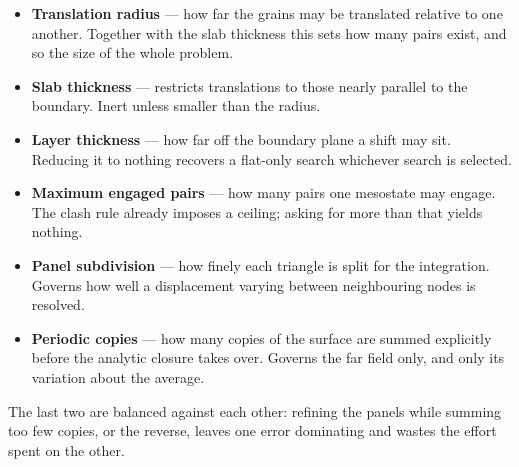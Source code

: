 \documentclass[11pt]{article}
\begin{document}
\begin{itemize}
  \item \textbf{Translation radius} --- how far the grains may be translated
        relative to one another. Together with the slab thickness this sets how
        many pairs exist, and so the size of the whole problem.
  \item \textbf{Slab thickness} --- restricts translations to those nearly
        parallel to the boundary. Inert unless smaller than the radius.
  \item \textbf{Layer thickness} --- how far off the boundary plane a shift may
        sit. Reducing it to nothing recovers a flat-only search whichever search
        is selected.
  \item \textbf{Maximum engaged pairs} --- how many pairs one mesostate may
        engage. The clash rule already imposes a ceiling; asking for more than
        that yields nothing.
  \item \textbf{Panel subdivision} --- how finely each triangle is split for the
        integration. Governs how well a displacement varying between neighbouring
        nodes is resolved.
  \item \textbf{Periodic copies} --- how many copies of the surface are summed
        explicitly before the analytic closure takes over. Governs the far field
        only, and only its variation about the average.
\end{itemize}

The last two are balanced against each other: refining the panels while summing
too few copies, or the reverse, leaves one error dominating and wastes the
effort spent on the other.
\end{document}
